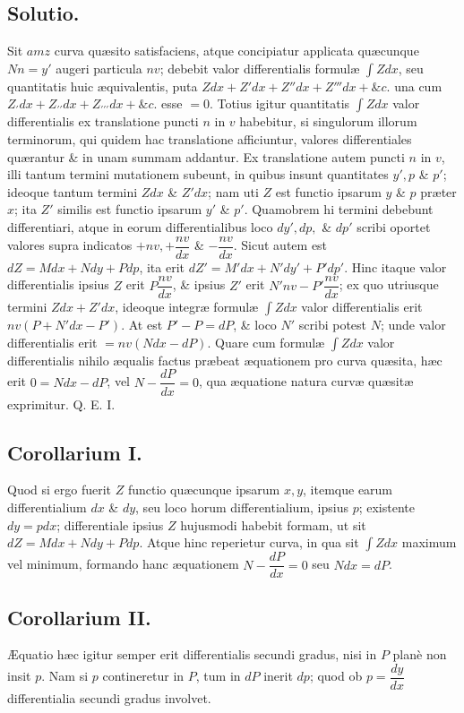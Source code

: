 \subsection*{Solutio.}
Sit $amz$ curva quæsito satisfaciens, atque concipiatur applicata quæcunque $Nn=y'$ augeri particula $nv$; debebit valor differentialis formulæ $\int Zdx$, seu quantitatis huic æquivalentis, puta $Zdx+Z'dx+Z''dx+Z'''dx+\&c.$ una cum $Z_{\prime}dx+Z_{\prime\prime}dx+Z_{\prime\prime\prime}dx+\&c.$ esse $=0$. Totius igitur quantitatis $\int Zdx$ valor differentialis ex translatione puncti $n$ in $v$ habebitur, si singulorum illorum terminorum, qui quidem hac translatione afficiuntur, valores differentiales quærantur \& in unam summam addantur. Ex translatione autem puncti $n$ in $v$, illi tantum termini mutationem subeunt, in quibus insunt quantitates $y',p$ \& $p'$; ideoque tantum termini $Zdx$ \& $Z'dx$; nam uti $Z$ est functio ipsarum $y$ \& $p$ præter $x$; ita $Z'$ similis est functio ipsarum $y'$ \& $p'$. Quamobrem hi termini debebunt differentiari, atque in eorum differentialibus loco $dy',dp,$ \& $dp'$ scribi oportet valores supra indicatos $+nv,+\dfrac{nv}{dx}$ \& $-\dfrac{nv}{dx}$. Sicut autem est $dZ=Mdx+Ndy+Pdp$, ita erit $dZ'=M'dx+N'dy'+P'dp'$. Hinc itaque valor differentialis ipsius $Z$ erit $P\dfrac{nv}{dx}$, \& ipsius $Z'$ erit $N'nv-P'\dfrac{nv}{dx}$; ex quo utriusque termini $Zdx+Z'dx$, ideoque integræ formulæ $\int Zdx$ valor differentialis erit $nv\left(P+N'dx-P'\right)$. At est $P'-P=dP$, \& loco $N'$ scribi potest $N$; unde valor differentialis erit $=nv(Ndx-dP)$. Quare cum formulæ $\int Zdx$ valor differentialis nihilo æqualis factus præbeat æquationem pro curva quæsita, hæc erit $0=Ndx-dP$, vel $N-\dfrac{dP}{dx}=0$, qua æquatione natura curvæ quæsitæ exprimitur. Q. E. I.

\subsection*{Corollarium I.}
Quod si ergo fuerit $Z$ functio quæcunque ipsarum $x,y$, itemque earum differentialium $dx$ \& $dy$, seu loco horum differentialium, ipsius $p$; existente $dy=pdx$; differentiale ipsius $Z$ hujusmodi habebit formam, ut sit $dZ=Mdx+Ndy+Pdp$. Atque hinc reperietur curva, in qua sit $\int Zdx$ maximum vel minimum, formando hanc æquationem $N-\dfrac{dP}{dx}=0$ seu $Ndx=dP$.

\subsection*{Corollarium II.}
Æquatio hæc igitur semper erit differentialis secundi gradus, nisi in $P$ planè non insit $p$. Nam si $p$ contineretur in $P$, tum in $dP$ inerit $dp$; quod ob $p=\dfrac{dy}{dx}$ differentialia secundi gradus involvet.

